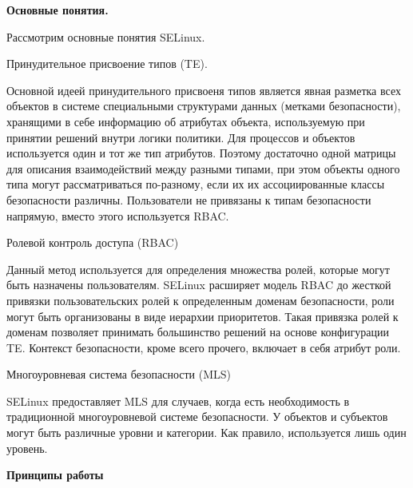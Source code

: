 \bigskip
{\bfseries Основные понятия. }

Рассмотрим основные понятия SELinux. 

\bigskip
Принудительное присвоение типов (TE). 

Основной идеей принудительного присвоеня
типов является явная разметка всех объектов 
в системе специальными структурами данных 
(метками безопасности), хранящими в себе информацию
об атрибутах объекта, используемую при принятии 
решений внутри логики политики. 
Для процессов и объектов используется 
один и тот же тип атрибутов. Поэтому достаточно 
одной матрицы для описания взаимодействий между 
разными типами, при этом объекты одного типа могут 
рассматриваться по-разному, если их их ассоциированные 
классы безопасности различны. Пользователи не 
привязаны к типам безопасности напрямую, вместо 
этого используется RBAC.

\bigskip
Ролевой контроль доступа (RBAC) 

Данный метод используется для определения 
множества ролей, которые могут 
быть назначены пользователям. SELinux расширяет 
модель RBAC до жесткой привязки пользовательских 
ролей к определенным доменам безопасности, роли 
могут быть организованы в виде иерархии приоритетов. 
Такая привязка ролей к доменам позволяет принимать 
большинство решений на основе конфигурации TE. 
Контекст безопасности, кроме всего прочего, включает 
в себя атрибут роли.

\bigskip
Многоуровневая система безопасности (MLS) 

SELinux предоставляет MLS для случаев, когда есть 
необходимость в традиционной многоуровневой системе 
безопасности. У объектов и субъектов могут быть 
различные уровни и категории. 
Как правило, используется лишь один уровень. 

\bigskip
{\bfseries Принципы работы}

